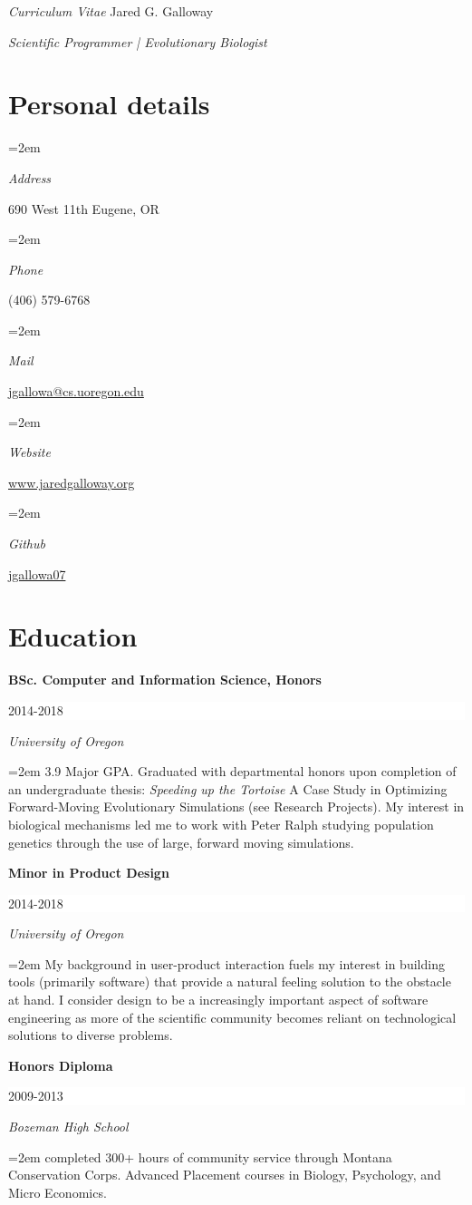 \documentclass[paper=a4,fontsize=11pt]{scrartcl} %
\newlength{\spacebox}
\newcommand{\sepspace}{\vspace*{1em}}		%
\newcommand{\MyName}[1]{ %
		\Huge \usefont{OT1}{phv}{b}{n} \hfill #1
		\par \normalsize \normalfont}
\newcommand{\MySlogan}[1]{ %
		\large \usefont{OT1}{phv}{m}{n}\hfill \textit{#1}
		\par \normalsize \normalfont}
\newcommand{\PersonalEntry}[2]{
		\noindent\hangindent=2em\hangafter=0 %
		\parbox{\spacebox}{        %
		\textit{#1}}		       %
		\hspace{1.5em} #2 \par}    %
\newcommand{\EducationEntry}[4]{
		\noindent \textbf{#1} \hfill      %
		\colorbox{White}{%
			\parbox{6em}{%
			\hfill\color{Black}#2}} \par  %
		\noindent \textit{#3} \par        %
		\noindent\hangindent=2em\hangafter=0 \small #4 %
		\normalsize \par}
\begin{document}

\textit{Curriculum Vitae}
\MyName{Jared G. Galloway}
\MySlogan{Scientific Programmer | Evolutionary Biologist}
\sepspace

\sepspace

\section*{Personal details}{
}
\PersonalEntry{Address}{690 West 11th Eugene, OR}
\PersonalEntry{Phone}{(406) 579-6768}
\PersonalEntry{Mail}{\url{jgallowa@cs.uoregon.edu}}
\PersonalEntry{Website}{\href{https://www.jaredgalloway.org}{www.jaredgalloway.org}}
\PersonalEntry{Github}{\href{https://github.com/jgallowa07}{jgallowa07}}

\section*{Education}{}

\EducationEntry{BSc. Computer and Information Science, Honors}{2014-2018}{University of Oregon}
{3.9 Major GPA. Graduated with departmental honors upon completion of an undergraduate thesis:
\textit{Speeding up the Tortoise}
A Case Study in Optimizing Forward-Moving Evolutionary Simulations (see Research Projects).
My interest in biological mechanisms led me to work with Peter Ralph studying population
genetics through the use of large, forward moving simulations.}
\sepspace

\EducationEntry{Minor in Product Design}{2014-2018}{University of Oregon}
{My background in user-product interaction fuels my interest in building tools (primarily software)
that provide a natural feeling solution to the obstacle at hand. I consider design to be a increasingly
important aspect of software engineering as more of the scientific community 
becomes reliant on technological solutions to diverse problems. 
}
\sepspace

\EducationEntry{Honors Diploma}{2009-2013}{Bozeman High School}
{completed 300+ hours of community service through Montana Conservation Corps.
Advanced Placement courses in Biology, Psychology, and Micro Economics.
}
\sepspace
\end{document}

